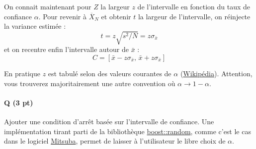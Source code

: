 \documentclass{article}
\newcommand{\link}[2]{\href{#1}{\color[rgb]{0, 0, 1}#2}}
\newcounter{questionsCounter}
\newcounter{pointsCounter}
\newcommand{\question}[1]{%
    \addtocounter{questionsCounter}{1}%
    \addtocounter{pointsCounter}{#1}%
    \vspace{-8pt}\paragraph{Q\arabic{questionsCounter} (#1 pt\protect\ifthenelse{#1 = 1}{}{s})}%
}
\newcommand{\hidden}[1]{{\color[rgb]{1, 0, 0}#1}}
\renewcommand{\hidden}[1]{}
\begin{document}
On connait maintenant pour $Z$ la largeur $z$ de l'intervalle en fonction du taux de confiance $\alpha$.
Pour revenir à $\overline{X}_N$ et obtenir $t$ la largeur de l'intervalle, on réinjecte la variance estimée :%
%
\begin{equation*}
    t = z\sqrt{s^2/N} = z\sigma_{\bar{x}}
\end{equation*}%
%
et on recentre enfin l'intervalle autour de $\bar{x}$ :%
%
\begin{equation*}
    C = [
        \bar{x} - z\sigma_{\bar{x}},\,
        \bar{x} + z\sigma_{\bar{x}}
    ]
\end{equation*}

En pratique $z$ est tabulé selon des valeurs courantes de $\alpha$ (\link{https://en.wikipedia.org/wiki/Confidence_interval\#Basic_steps}{Wikipédia}).
Attention, vous trouverez majoritairement une autre convention où $\alpha \rightarrow 1 - \alpha$.

\question{3} Ajouter une condition d'arrêt basée sur l'intervalle de confiance.
Une implémentation tirant parti de la bibliothèque \link{https://www.boost.org/doc/libs/1_71_0/doc/html/boost_random/reference.html\#boost_random.reference.distributions}{boost::random}, comme c'est le cas dans le logiciel \link{https://www.mitsuba-renderer.org/}{Mitsuba}, permet de laisser à l'utilisateur le libre choix de $\alpha$.

\hidden{%
En soit la première partie de la question revient à diviser le seuil d'erreur standard par $z$, donc pour avoir tous les points on attend un peu mieux.
}

\hidden{TOTAL POINTS = \arabic{pointsCounter}}
\end{document}
